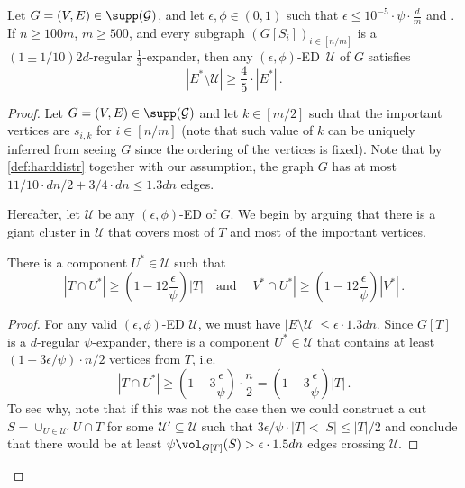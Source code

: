 \begin{lemma} \label{lem:special-edge}
	Let $G=(V,E) \in \supp(\mathcal{G})$, and let $\epsilon,\phi \in (0,1)$ such that $\epsilon \le 10^{-5} \cdot \psi \cdot \frac{d}{m}$ and . If $n \ge 100 m$, $m\ge 500$, and every subgraph $(G[S_i])_{i \in [n/m]}$ is a $(1 \pm 1/10)2d$-regular $\frac{1}{3}$-expander, then any $(\epsilon,\phi)$-ED~$\mathcal{U}$ of $G$ satisfies
	\begin{equation*}
		\left| E^* \setminus \mathcal{U}\right| \ge \frac{4}{5} \cdot \left| E^*\right| \, .
	\end{equation*}
\end{lemma}

\begin{proof} 
	Let $G=(V,E) \in \supp(\mathcal{G})$ and let $k \in [m/2]$ such that the important vertices are $s_{i,k}$ for $i \in [n/m]$ (note that such value of $k$ can be uniquely inferred from seeing $G$ since the ordering of the vertices is fixed). Note that by \cref{def:harddistr} together with our assumption, the graph $G$ has at most $11/10\cdot dn/2+3/4 \cdot dn \le 1.3 dn$ edges.
	
	Hereafter, let $\mathcal{U}$ be any $(\epsilon,\phi)$-ED of $G$. We begin by arguing that there is a giant cluster in $\mathcal{U}$ that covers most of $T$ and most of the important vertices.
	
	\begin{claim}
		\label{claim:giantcluster}
		There is a component $U^* \in \mathcal{U}$ such that
		\begin{equation*}
			|T \cap U^*| \ge\left(1-12\frac{\epsilon}{\psi}\right) |T| \quad \text{and} \quad |V^* \cap U^*| \ge  \left(1-12\frac{\epsilon}{\psi}\right) |V^*| \, .
		\end{equation*}
	\end{claim}
	\begin{proof}
		For any valid $(\epsilon,\phi)$-ED $\mathcal{U}$, we must have $|E \setminus \mathcal{U}| \le \epsilon \cdot 1.3 dn$. Since $G[T]$ is a $d$-regular $\psi$-expander, there is a component $U^* \in \mathcal{U}$ that contains at least $(1-3 \epsilon/\psi) \cdot n/2$ vertices from $T$, i.e.
		\begin{equation*}
		|T \cap U^* | \ge\left(1-3\frac{\epsilon}{\psi}\right)\cdot \frac{n}{2} = \left(1-3\frac{\epsilon}{\psi}\right)|T|   \, .
		\end{equation*}
		To see why, note that if this was not the case then we could construct a cut $S = \cup_{U \in \mathcal{U}'} U \cap T$ for some $\mathcal{U}' \subseteq \mathcal{U}$ such that $3\epsilon/\psi \cdot |T| < |S| \le |T|/2$ and conclude that there would be at least $ \psi \vol_{G[T]}(S) > \epsilon \cdot 1.5 dn$ edges crossing $\mathcal{U}$.
		

\end{proof}
\end{proof}
